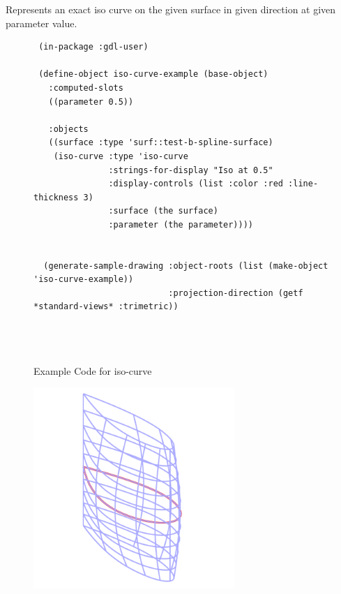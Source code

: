 \documentclass [11pt]{book}
\begin{document}
\begin{itemize}
\begin{description}
Represents an exact iso curve on the given surface in given direction at given parameter value.



\end{description}




\begin{figure}
\begin{lrbox}{\boxedverb}
\begin{minipage}{\linewidth}
{\small

\begin{verbatim}
 (in-package :gdl-user)

 (define-object iso-curve-example (base-object)
   :computed-slots
   ((parameter 0.5))
  
   :objects
   ((surface :type 'surf::test-b-spline-surface)
    (iso-curve :type 'iso-curve
               :strings-for-display "Iso at 0.5"
               :display-controls (list :color :red :line-thickness 3)
               :surface (the surface)
               :parameter (the parameter))))


  (generate-sample-drawing :object-roots (list (make-object 'iso-curve-example))
                           :projection-direction (getf *standard-views* :trimetric))

                  
 
\end{verbatim}}
\end{minipage}
\end{lrbox}
\fbox{\usebox{\boxedverb}}

\caption{Example Code for iso-curve}

\label{fig:example-code-iso-curve}

\end{figure}

\begin{figure}
\begin{center}
\includegraphics[width=3in,height=3in]{../images/example-iso-curve.pdf}
\end{center}


\end{figure}
\end{itemize}
\end{document}
